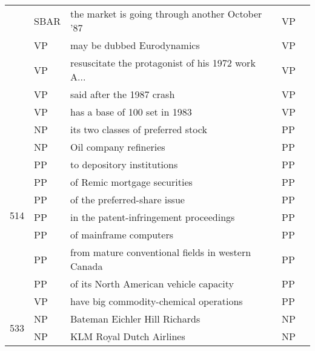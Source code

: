 \documentclass[11pt]{article}
\newcommand{\cmark}{\text{\ding{51}}}
\newcommand{\xmark}{\text{\ding{55}}}
\begin{document}
\begin{table*}[t]
\begin{center}
{\begin{tabular}{|l|l|l|l|l|}
    & SBAR &    the market is going through another October '87 &        VP &   \textcolor{alizarin}{\xmark} \\
    & VP &                         may be dubbed Eurodynamics &        VP &    \textcolor{cadmiumgreen}{\cmark} \\
    & VP &  resuscitate the protagonist of his 1972 work A... &        VP &    \textcolor{cadmiumgreen}{\cmark} \\
    & VP &                          said after the 1987 crash &        VP &    \textcolor{cadmiumgreen}{\cmark} \\
    & VP &                      has a base of 100 set in 1983 &        VP &    \textcolor{cadmiumgreen}{\cmark} \\
\hline
\multirow{10}{*}{514} & NP &                 its two classes of preferred stock &        PP &   \textcolor{alizarin}{\xmark} \\
    & NP &                             Oil company refineries &        PP &   \textcolor{alizarin}{\xmark} \\
    & PP &                         to depository institutions &        PP &    \textcolor{cadmiumgreen}{\cmark} \\
    & PP &                       of Remic mortgage securities &        PP &    \textcolor{cadmiumgreen}{\cmark} \\
    & PP &                       of the preferred-share issue &        PP &    \textcolor{cadmiumgreen}{\cmark} \\
    & PP &             in the patent-infringement proceedings &        PP &    \textcolor{cadmiumgreen}{\cmark} \\
    & PP &                             of mainframe computers &        PP &    \textcolor{cadmiumgreen}{\cmark} \\
    & PP &  from mature conventional fields in western Canada &        PP &    \textcolor{cadmiumgreen}{\cmark} \\
    & PP &             of its North American vehicle capacity &        PP &    \textcolor{cadmiumgreen}{\cmark} \\
    & VP &             have big commodity-chemical operations &        PP &   \textcolor{alizarin}{\xmark} \\
\hline
\multirow{5}{*}{533} & NP &                      Bateman Eichler Hill Richards &        NP &    \textcolor{cadmiumgreen}{\cmark} \\
    & NP &                           KLM Royal Dutch Airlines &        NP &    \textcolor{cadmiumgreen}{\cmark} \\

\end{tabular}}
\end{center}
\end{table*}
\end{document}
